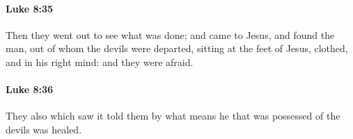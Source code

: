 		\paragraph{Luke 8:35} %
			\label{LUKE-8-35}

			Then they went out to see what was done; and came to Jesus, and found the man, out of whom the devils were departed, sitting at the feet of Jesus, clothed, and in his right mind: and they were afraid.

			\begin{framed}
			\scriptsize
				\begin{compactdesc}
					\item[SBLG] 
				\end{compactdesc}
			\end{framed}

		\paragraph{Luke 8:36} %
			\label{LUKE-8-36}

			They also which saw it told them by what means he that was possessed of the devils was healed.

